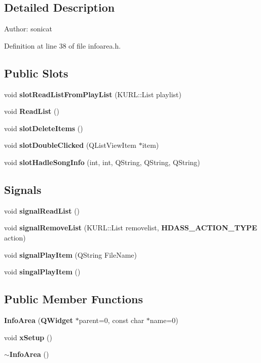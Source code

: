 \subsection{Detailed Description}
\begin{Desc}
\item[Author:]sonicat \end{Desc}




Definition at line 38 of file infoarea.h.\subsection*{Public Slots}
\begin{CompactItemize}
\item 
void {\bf slot\-Read\-List\-From\-Play\-List} (KURL::List playlist)
\item 
void {\bf Read\-List} ()
\item 
void {\bf slot\-Delete\-Items} ()
\item 
void {\bf slot\-Double\-Clicked} (QList\-View\-Item $\ast$item)
\item 
void {\bf slot\-Hadle\-Song\-Info} (int, int, QString, QString, QString)
\end{CompactItemize}
\subsection*{Signals}
\begin{CompactItemize}
\item 
void {\bf signal\-Read\-List} ()
\item 
void {\bf signal\-Remove\-List} (KURL::List removelist, {\bf HDASS\_\-ACTION\_\-TYPE} action)
\item 
void {\bf signal\-Play\-Item} (QString File\-Name)
\item 
void {\bf singal\-Play\-Item} ()
\end{CompactItemize}
\subsection*{Public Member Functions}
\begin{CompactItemize}
\item 
{\bf Info\-Area} ({\bf QWidget} $\ast$parent=0, const char $\ast$name=0)
\item 
void {\bf x\-Setup} ()
\item 
{\bf $\sim$Info\-Area} ()
\end{CompactItemize}

